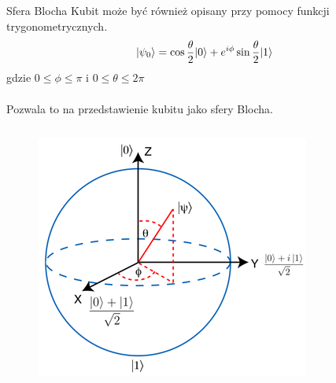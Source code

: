 \documentclass{beamer}
\DeclarePairedDelimiter\ket{\lvert}{\rangle}
\begin{document}
	
	\begin{frame}{}
		\begin{block}{Sfera Blocha}
			\vspace{0.5em}
			Kubit może być również opisany przy pomocy funkcji trygonometrycznych.
			\begin{equation*}
			\ket{\psi_{0}} = \cos{\frac{\theta}{2}}\ket{0} + e^{i\phi}\sin{\frac{\theta}{2}}\ket{1} 
			\end{equation*}
			gdzie $0\leq\phi\leq\pi$ i $0\leq\theta\leq2\pi$\\~\\
			Pozwala to na przedstawienie kubitu jako sfery Blocha.
		\end{block}
		\begin{columns}
			\begin{column}{0.5\textwidth}
				\begin{center}
					\begin{figure}[hbt!]
						\includegraphics[scale=0.7]{media/bloch.png}
					\end{figure}
				\end{center}	
			\end{column}
			

\end{columns}
\end{frame}
\end{document}
